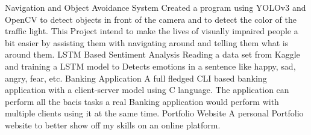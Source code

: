 \vspace{-3mm}
  \cvproject
    {Navigation and Object Avoidance System}
    {Created a program using YOLOv3 and OpenCV to detect objects in front of the camera and to detect the color of the traffic light. This Project intend to make the lives of visually impaired people a bit easier by assisting them with navigating around and telling them what is around them.}
  \cvproject
     {LSTM Based Sentiment Analysis}
     {Reading a data set from Kaggle  and training a LSTM model to Detects emotions in a sentence like happy, sad, angry, fear, etc.}
  \cvproject
    {Banking Application}
    {A full fledged CLI based banking application with a client-server model using C language. The application can perform all the bacis tasks a real Banking application would perform with multiple clients using it at the same time.}
  \cvproject
    {Portfolio Website}
    {A personal Portfolio website to better show off my skills on an online platform.}
\vspace{-2mm}